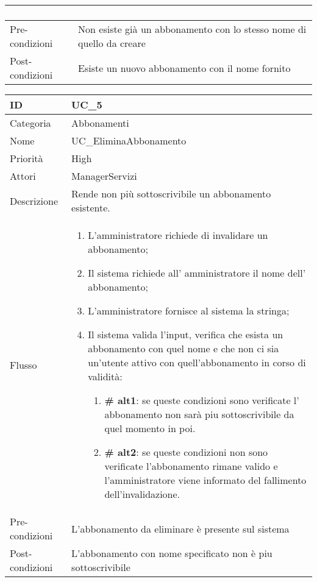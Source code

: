 \begin{center}
\begin{tabular}{ |p{2cm}|p{13cm}|  }
\begin{enumerate}
		\end{enumerate}\\\hline
Pre-condizioni &  Non esiste già un abbonamento con lo stesso nome di quello da creare\\\hline
Post-condizioni &  Esiste un nuovo abbonamento con il nome fornito\\\hline
\end{tabular}
\label{table_use_case:4}\newline

\begin{tabular}{ |p{2cm}|p{13cm}|  }
\hline
ID & UC\_5 \\\hline
Categoria & Abbonamenti\\\hline
Nome & UC\_EliminaAbbonamento\\\hline
Priorità & High \\\hline
Attori &  ManagerServizi \\\hline
Descrizione & Rende non più sottoscrivibile un abbonamento esistente.\\\hline
Flusso &  	\begin{enumerate}
			\item L'amministratore richiede di invalidare un abbonamento;
			\item Il sistema richiede all' amministratore il nome dell' abbonamento;
			\item L'amministratore fornisce al sistema la stringa;
			\item Il sistema valida l'input, verifica che esista un abbonamento con quel nome e che non ci sia un'utente attivo con quell'abbonamento in corso di validità:
				\begin{enumerate}[  ]
					\item \textbf{\# alt1}: se queste condizioni sono verificate l' abbonamento non sarà piu sottoscrivibile da quel momento in poi.
					\item \textbf{\# alt2}: se queste condizioni non sono verificate l'abbonamento rimane valido e l'amministratore viene informato del fallimento dell'invalidazione.
				\end{enumerate}
		\end{enumerate}\\\hline
Pre-condizioni &  L'abbonamento da eliminare è presente sul sistema\\\hline
Post-condizioni &   L'abbonamento con nome specificato non è piu sottoscrivibile\\\hline
\end{tabular}
\label{table_use_case:5}\newline


\end{center}
